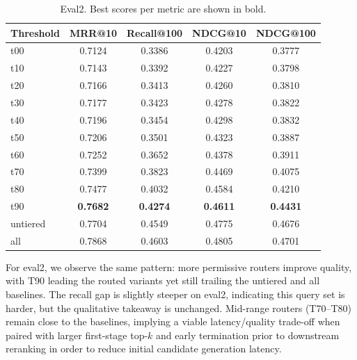 \documentclass[11pt]{article}
\begin{document}
\begin{table}[H]
\centering
\small
\begin{tabular}{lcccc}
\toprule
\textbf{Threshold} & \textbf{MRR@10} & \textbf{Recall@100} & \textbf{NDCG@10} & \textbf{NDCG@100} \\
\midrule
t00 & 0.7124 & 0.3386 & 0.4203 & 0.3777 \\
t10 & 0.7143 & 0.3392 & 0.4227 & 0.3798 \\
t20 & 0.7166 & 0.3413 & 0.4260 & 0.3810 \\
t30 & 0.7177 & 0.3423 & 0.4278 & 0.3822 \\
t40 & 0.7196 & 0.3454 & 0.4298 & 0.3832 \\
t50 & 0.7206 & 0.3501 & 0.4323 & 0.3887 \\
t60 & 0.7252 & 0.3652 & 0.4378 & 0.3911 \\
t70 & 0.7399 & 0.3823 & 0.4469 & 0.4075 \\
t80 & 0.7477 & 0.4032 & 0.4584 & 0.4210 \\
t90 & \textbf{0.7682} & \textbf{0.4274} & \textbf{0.4611} & \textbf{0.4431} \\
\midrule
untiered & 0.7704 & 0.4549 & 0.4775 & 0.4676 \\
all      & 0.7868 & 0.4603 & 0.4805 & 0.4701 \\
\bottomrule
\end{tabular}
\caption{Eval2. Best scores per metric are shown in bold.}
\label{tab:eval2}
\end{table}
\newpage
For eval2, we observe the same pattern: more permissive routers improve quality, with T90 leading the routed variants yet still trailing the untiered and all baselines. The recall gap is slightly steeper on eval2, indicating this query set is harder, but the qualitative takeaway is unchanged. Mid-range routers (T70–T80) remain close to the baselines, implying a viable latency/quality trade-off when paired with larger first-stage top-$k$ and early termination prior to downstream reranking in order to reduce initial candidate generation latency.
\end{document}
